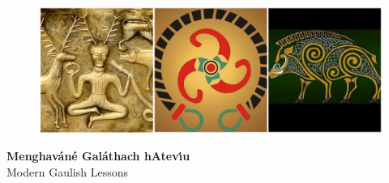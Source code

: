 \thispagestyle{empty} %

\begin{center}

\begin{figure}[H]
\centering
\includegraphics[width=16.0cm]{img/triple-image-banner}
\end{figure}
\textbf{\Huge Menghav\'{a}n\'{e} Gal\'{a}thach hAtev\'{\i}u}\\
{\huge Modern Gaulish Lessons}\\

\vspace*{\fill}

\end{center}
